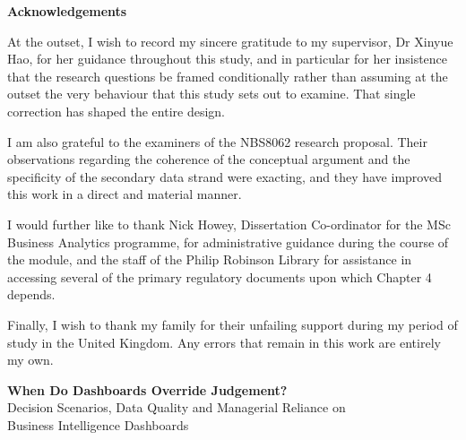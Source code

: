 \documentclass[12pt,a4paper]{article}
\begin{document}
\newpage
\begin{center}{\large\bfseries Acknowledgements}\end{center}
\vspace{12pt}

At the outset, I wish to record my sincere gratitude to my supervisor, Dr Xinyue Hao, for her guidance
throughout this study, and in particular for her insistence that the research questions be framed
conditionally rather than assuming at the outset the very behaviour that this study sets out to examine.
That single correction has shaped the entire design.

I am also grateful to the examiners of the NBS8062 research proposal. Their observations regarding the
coherence of the conceptual argument and the specificity of the secondary data strand were exacting, and
they have improved this work in a direct and material manner.

I would further like to thank Nick Howey, Dissertation Co-ordinator for the MSc Business Analytics
programme, for administrative guidance during the course of the module, and the staff of the Philip
Robinson Library for assistance in accessing several of the primary regulatory documents upon which
Chapter 4 depends.

Finally, I wish to thank my family for their unfailing support during my period of study in the United
Kingdom. Any errors that remain in this work are entirely my own.

\newpage
\begin{center}
{\large\bfseries When Do Dashboards Override Judgement?}\\[6pt]
{\large Decision Scenarios, Data Quality and Managerial Reliance on\\[4pt]
Business Intelligence Dashboards}
\end{center}
\vspace{12pt}
\end{document}
